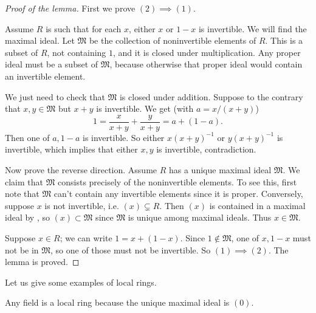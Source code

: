 \begin{proof}[Proof of the lemma]
First we prove $(2) \implies (1)$.

Assume $R$ is such that for
each $x$, either $x$ or $1-x$ is invertible.  We will find the maximal ideal.
Let $\mathfrak{M} $ be the collection of noninvertible elements of $R$. This is
a subset of $R$, not containing $1$,  and it is closed under multiplication.
Any proper ideal must be a subset of $\mathfrak{M}$, because otherwise that
proper ideal would contain an invertible element.

We just need to check that $\mathfrak{M}$ is closed under addition.
Suppose to the
contrary that $x, y \in \mathfrak{M}$ but $x+y$ is invertible.   We get (with
$a = x/(x+y)$)
\[ 1 = \frac{x}{x+y} + \frac{y}{x+y} =a+(1-a). \]
Then one of $a,1-a$ is invertible. So either $x(x+y)^{-1}$  or $y(x+y)^{-1}$ is
invertible, which implies that either $x,y$ is invertible, contradiction.

Now prove the reverse direction. Assume $R$ has a unique maximal ideal
$\mathfrak{M}$.  We claim that $\mathfrak{M}$ consists precisely of the
noninvertible elements.  To see this, first note that $\mathfrak{M}$
can't contain any invertible elements since it is proper.  Conversely, suppose
$x$ is not invertible, i.e. $(x) \subsetneq R$.  Then $(x)$ is contained in a
maximal ideal by ,  so $(x) \subset
\mathfrak{M}$ since $\mathfrak{M}$ is unique among maximal ideals.
Thus $x \in \mathfrak{M}$.

Suppose $x \in R$; we can write $1 = x + (1-x)$. Since $1 \notin \mathfrak{M}$,
one of $x, 1-x$ must not be in $\mathfrak{M}$, so one of those must not be
invertible. So $(1) \implies (2)$.   The lemma is proved.
\end{proof}

Let us give some examples of local rings.

\begin{example}
Any field is a local ring because the unique maximal ideal is $(0)$.
\end{example}

